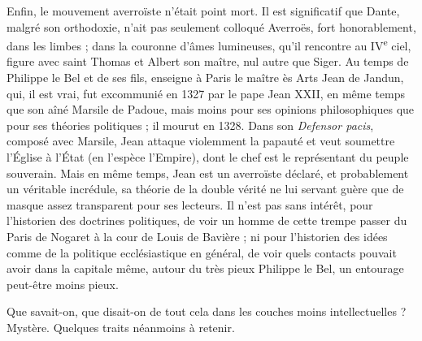 \documentclass[french,twoside]{book} %
\begin{document}
Enfin, le mouvement averroïste n’était point mort. Il est significatif que Dante, malgré son orthodoxie, n’ait pas seulement colloqué Averroës, fort honorablement, dans les limbes ; dans la couronne d’âmes lumineuses, qu’il rencontre au IV\textsuperscript{e} ciel, figure avec saint Thomas et Albert son maître, nul autre que Siger. Au temps de Philippe le Bel et de ses fils, enseigne à Paris le maître ès Arts Jean de Jandun, qui, il est vrai, fut excommunié en 1327 par le pape Jean XXII, en même temps que son aîné Marsile de Padoue, mais moins pour ses opinions philosophiques que pour ses théories politiques ; il mourut en 1328. Dans son {\itshape Defensor pacis}, composé avec Marsile, Jean attaque violemment la papauté et veut soumettre l’Église à l’État (en l’espèce l’Empire), dont le chef est le représentant du peuple souverain. Mais en même temps, Jean est un averroïste déclaré, et probablement un véritable incrédule, sa théorie de la double vérité ne lui servant guère que de masque assez transparent pour ses lecteurs. Il n’est pas sans intérêt, pour l’historien des doctrines politiques, de voir un homme de cette trempe passer du Paris de Nogaret à la cour de Louis de Bavière ; ni pour l’historien des idées comme de la politique ecclésiastique en général, de voir quels contacts pouvait avoir dans la capitale même, autour du très pieux Philippe le Bel, un entourage peut-être moins pieux.\par
Que savait-on, que disait-on de tout cela dans les couches moins intellectuelles ? Mystère. Quelques traits néanmoins à retenir.\par
\end{document}
